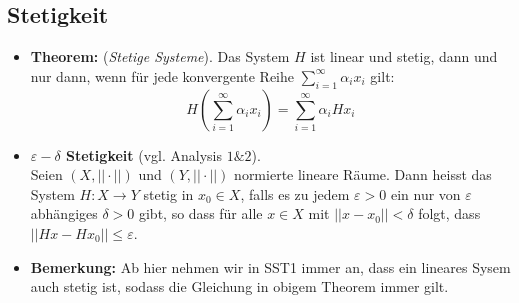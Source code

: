 \documentclass[11pt]{article}
\begin{document}
\subsection*{Stetigkeit}
\vspace*{-0.5cm}
\begin{itemize}[leftmargin = 0pt]
    \item[] \textbf{Theorem:} (\textit{Stetige Systeme}). Das System $H$ ist linear und stetig, dann und nur dann, wenn für jede konvergente Reihe $\sum_{i=1}^\infty \alpha_i x_i$ gilt:
    $$H\left( \sum_{i=1}^\infty \alpha_i x_i \right) = \sum_{i=1}^\infty \alpha_i H x_i$$
    \item[] \textbf{$\varepsilon-\delta$ Stetigkeit} (vgl. Analysis $1 \& 2$).\\Seien $(X, ||\cdot||)$ und $(Y, ||\cdot||)$ normierte lineare Räume. Dann heisst das System $H:X \to Y$ stetig in $x_0 \in X$, falls es zu jedem $\varepsilon > 0$ ein nur von $\varepsilon$ abhängiges $\delta >0$ gibt, so dass für alle $x\in X$ mit $||x-x_0||<\delta$ folgt, dass $||Hx-Hx_0||\leq \varepsilon$.
    \item[] \textbf{Bemerkung:} Ab hier nehmen wir in SST1 immer an, dass ein lineares Sysem auch stetig ist, sodass die Gleichung in obigem Theorem immer gilt.
\end{itemize}
\end{document}

